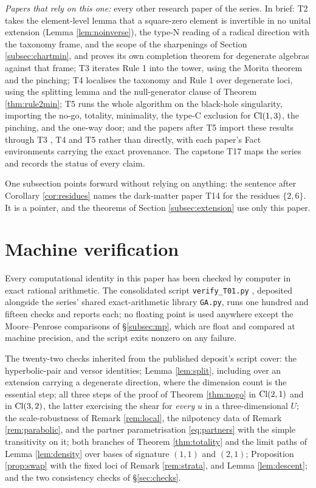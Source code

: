 \emph{Papers that rely on this one:} every other research paper of the series. In brief: T2 \cite{ButlerT2} takes the element-level lemma that a square-zero element is invertible in no unital extension (Lemma \ref{lem:noinverse}), the type-N reading of a radical direction with the taxonomy frame, and the scope of the sharpenings of Section \ref{subsec:chartmin}, and proves its own completion theorem for degenerate algebras against that frame; T3 \cite{ButlerT3} iterates Rule 1 into the tower, using the Morita theorem and the pinching; T4 \cite{ButlerT4} localises the taxonomy and Rule 1 over degenerate loci, using the splitting lemma and the null-generator clause of Theorem \ref{thm:rule2min}; T5 \cite{ButlerT5} runs the whole algorithm on the black-hole singularity, importing the no-go, totality, minimality, the type-C exclusion for $\mathrm{Cl}(1,3)$, the pinching, and the one-way door; and the papers after T5 \cite{ButlerT5} import these results through T3 \cite{ButlerT3}, T4 \cite{ButlerT4} and T5 \cite{ButlerT5} rather than directly, with each paper's Fact environments carrying the exact provenance. The capstone T17 \cite{ButlerT17} maps the series and records the status of every claim.

One subsection points forward without relying on anything: the sentence after Corollary \ref{cor:residues} names the dark-matter paper T14 \cite{ButlerT14} for the residues $\{2, 6\}$. It is a pointer, and the theorems of Section \ref{subsec:extension} use only this paper.

\section{Machine verification}\label{sec:verification}

Every computational identity in this paper has been checked by computer in exact rational arithmetic. The consolidated script \texttt{verify\_T01.py} \cite{ButlerVerifyT01}, deposited alongside the series' shared exact-arithmetic library \texttt{GA.py}, runs one hundred and fifteen checks and reports each; no floating point is used anywhere except the Moore--Penrose comparisons of \S\ref{subsec:mp}, which are float and compared at machine precision, and the script exits nonzero on any failure.

The twenty-two checks inherited from the published deposit's script cover: the hyperbolic-pair and versor identities; Lemma \ref{lem:split}, including over an extension carrying a degenerate direction, where the dimension count is the essential step; all three steps of the proof of Theorem \ref{thm:nogo} in $\mathrm{Cl}(2,1)$ and in $\mathrm{Cl}(3,2)$, the latter exercising the shear for \emph{every} $u$ in a three-dimensional $U$; the scale-robustness of Remark \ref{rem:local}, the nilpotency data of Remark \ref{rem:parabolic}, and the partner parametrisation \eqref{eq:partners} with the simple transitivity on it; both branches of Theorem \ref{thm:totality} and the limit paths of Lemma \ref{lem:density} over bases of signature $(1,1)$ and $(2,1)$; Proposition \ref{prop:swap} with the fixed loci of Remark \ref{rem:strata}, and Lemma \ref{lem:descent}; and the two consistency checks of \S\ref{sec:checks}.

